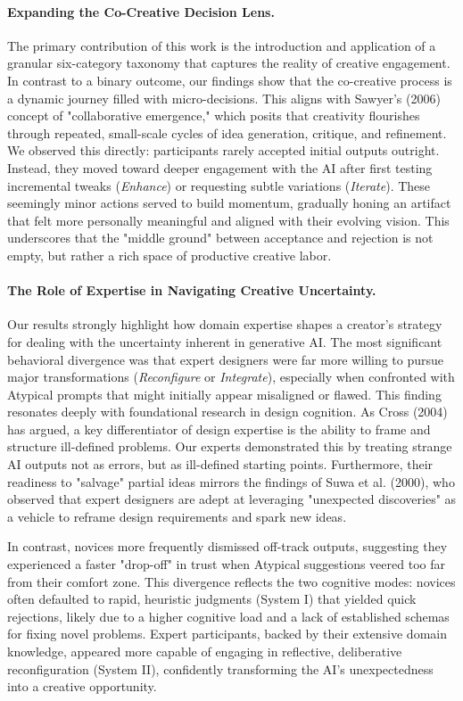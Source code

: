 \documentclass[letterpaper]{article} %
\begin{document}
\paragraph{Expanding the Co-Creative Decision Lens.}
The primary contribution of this work is the introduction and application of a granular six-category taxonomy that captures the reality of creative engagement. In contrast to a binary outcome, our findings show that the co-creative process is a dynamic journey filled with micro-decisions. This aligns with Sawyer’s (2006) concept of "collaborative emergence," which posits that creativity flourishes through repeated, small-scale cycles of idea generation, critique, and refinement. We observed this directly: participants rarely accepted initial outputs outright. Instead, they moved toward deeper engagement with the AI after first testing incremental tweaks (\textit{Enhance}) or requesting subtle variations (\textit{Iterate}). These seemingly minor actions served to build momentum, gradually honing an artifact that felt more personally meaningful and aligned with their evolving vision. This underscores that the "middle ground" between acceptance and rejection is not empty, but rather a rich space of productive creative labor.

\paragraph{The Role of Expertise in Navigating Creative Uncertainty.}
Our results strongly highlight how domain expertise shapes a creator's strategy for dealing with the uncertainty inherent in generative AI. The most significant behavioral divergence was that expert designers were far more willing to pursue major transformations (\textit{Reconfigure} or \textit{Integrate}), especially when confronted with Atypical prompts that might initially appear misaligned or flawed. This finding resonates deeply with foundational research in design cognition. As Cross (2004) has argued, a key differentiator of design expertise is the ability to frame and structure ill-defined problems. Our experts demonstrated this by treating strange AI outputs not as errors, but as ill-defined starting points. Furthermore, their readiness to "salvage" partial ideas mirrors the findings of Suwa et al. (2000), who observed that expert designers are adept at leveraging "unexpected discoveries" as a vehicle to reframe design requirements and spark new ideas.

In contrast, novices more frequently dismissed off-track outputs, suggesting they experienced a faster "drop-off" in trust when Atypical suggestions veered too far from their comfort zone. This divergence reflects the two cognitive modes: novices often defaulted to rapid, heuristic judgments (System I) that yielded quick rejections, likely due to a higher cognitive load and a lack of established schemas for fixing novel problems. Expert participants, backed by their extensive domain knowledge, appeared more capable of engaging in reflective, deliberative reconfiguration (System II), confidently transforming the AI's unexpectedness into a creative opportunity.
\end{document}
